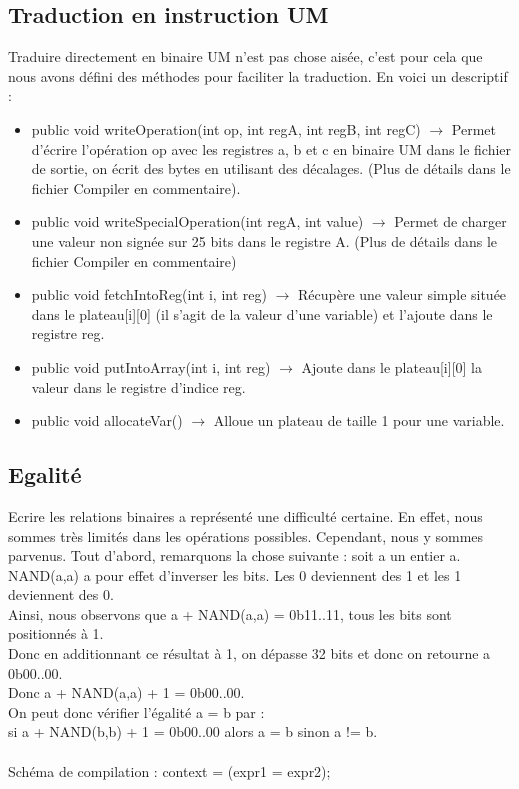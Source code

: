 \documentclass[a4paper,12pt]{report}
\begin{document}
\subsection{Traduction en instruction UM}
Traduire directement en binaire UM n'est pas chose aisée, c'est pour cela que nous avons défini des méthodes pour faciliter la traduction.
En voici un descriptif :
\begin{itemize}
 \item public void writeOperation(int op, int regA, int regB, int regC) $\rightarrow$ Permet d'écrire l'opération op avec les registres
 a, b et c en binaire UM dans le fichier de sortie, on écrit des bytes en utilisant des décalages. (Plus de détails dans le fichier Compiler
 en commentaire).
 \item public void writeSpecialOperation(int regA, int value) $\rightarrow$ Permet de charger une valeur non signée sur 25 bits dans 
 le registre A. (Plus de détails dans le fichier Compiler en commentaire)
 \item public void fetchIntoReg(int i, int reg) $\rightarrow$ Récupère une valeur simple située dans le plateau[i][0] (il s'agit de la valeur d'une variable) 
 et l'ajoute dans le registre reg.
 \item public void putIntoArray(int i, int reg) $\rightarrow$ Ajoute dans le plateau[i][0] la valeur dans le registre d'indice reg.
 \item public void allocateVar() $\rightarrow$ Alloue un plateau de taille 1 pour une variable.
\end{itemize}

\subsection{Egalité}
Ecrire les relations binaires a représenté une difficulté certaine. En effet, nous sommes très limités dans les opérations possibles.
Cependant, nous y sommes parvenus. Tout d'abord, remarquons la chose suivante : soit a un entier a. NAND(a,a) a pour effet d'inverser les bits. Les 0 deviennent des 1 et les 1 deviennent des
0. \\
Ainsi, nous observons que a + NAND(a,a) = 0b11..11, tous les bits sont positionnés à 1. \\
Donc en additionnant ce résultat à 1, on dépasse 32 bits et donc on retourne a 0b00..00. \\
Donc a + NAND(a,a) + 1 = 0b00..00. \\
On peut donc vérifier l'égalité a = b par : \\
si a + NAND(b,b) + 1 = 0b00..00 alors a = b sinon a != b.
\\ \\
Schéma de compilation : context = (expr1 = expr2);
\end{document}
